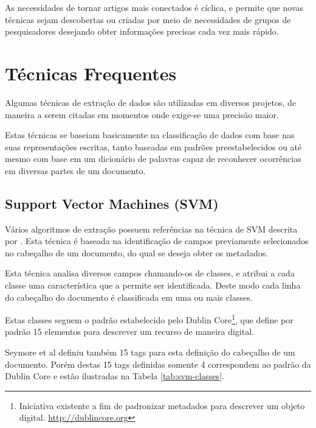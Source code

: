 \documentclass[
	12pt,               %
	openright,          %
	twoside,            %
	a4paper,            %
	english,            %
	brazil              %
	]{abntex2}
\begin{document}
As necessidades de tornar artigos mais conectados é cíclica, e permite que novas técnicas sejam descobertas ou criadas por meio de necessidades de grupos de pesquisadores desejando obter informações precisas cada vez mais rápido.

\section{Técnicas Frequentes}

Algumas técnicas de extração de dados são utilizadas em diversos projetos, de maneira a serem citadas em momentos onde exige-se uma precisão maior.

Estas técnicas se baseiam basicamente na classificação de dados com base nas suas representações escritas, tanto baseadas em padrões preestabelecidos ou até mesmo com base em um dicionário de palavras capaz de reconhecer ocorrências em diversas partes de um documento.

\subsection{Support Vector Machines (SVM)}

Vários algoritmos de extração possuem referências na técnica de SVM descrita por  \cite{svm}. Esta técnica é baseada na identificação de campos previamente selecionados no cabeçalho de um documento, do qual se deseja obter os metadados.

Esta técnica analisa diversos campos chamando-os de classes, e atribui a cada classe uma característica que a permite ser identificada. Deste modo cada linha do cabeçalho do documento é classificada em uma ou mais classes.

Estas classes seguem o padrão \cite{dublin-core} estabelecido pelo Dublin Core\footnote{Iniciativa existente a fim de padronizar metadados para descrever um objeto digital. \url{http://dublincore.org}}, que define por padrão 15 elementos para descrever um recurso de maneira digital.

Seymore et al \cite{seymore} definiu também 15 tags para esta definição do cabeçalho de um documento. Porém destas 15 tags definidas somente 4 correspondem ao padrão da Dublin Core e estão ilustradas na Tabela \ref{tab:svm-classes}.
\end{document}
